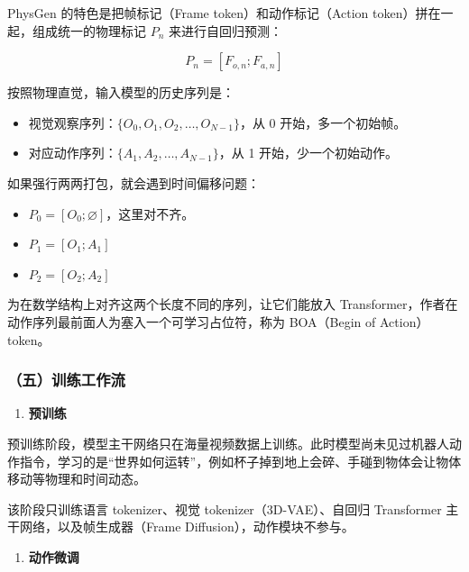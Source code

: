 PhysGen 的特色是把帧标记（Frame token）和动作标记（Action token）拼在一起，组成统一的物理标记 \(P_n\) 来进行自回归预测：

\[
P_n = [F_{o,n}; F_{a,n}]
\]

按照物理直觉，输入模型的历史序列是：

\begin{itemize}
\tightlist
\item
  视觉观察序列：\(\{O_0,O_1,O_2,\ldots,O_{N-1}\}\)，从 0 开始，多一个初始帧。
\item
  对应动作序列：\(\{A_1,A_2,\ldots,A_{N-1}\}\)，从 1 开始，少一个初始动作。
\end{itemize}

如果强行两两打包，就会遇到时间偏移问题：

\begin{itemize}
\tightlist
\item
  \(P_0 = [O_0; \varnothing]\)，这里对不齐。
\item
  \(P_1 = [O_1; A_1]\)
\item
  \(P_2 = [O_2; A_2]\)
\end{itemize}

为在数学结构上对齐这两个长度不同的序列，让它们能放入 Transformer，作者在动作序列最前面人为塞入一个可学习占位符，称为 BOA（Begin of Action）token。

\hypertarget{ux4e94ux8badux7ec3ux5de5ux4f5cux6d41}{%
\subsubsection{（五）训练工作流}\label{ux4e94ux8badux7ec3ux5de5ux4f5cux6d41}}

\begin{enumerate}
\def\labelenumi{\arabic{enumi}.}
\tightlist
\item
  \textbf{预训练}
\end{enumerate}

预训练阶段，模型主干网络只在海量视频数据上训练。此时模型尚未见过机器人动作指令，学习的是``世界如何运转''，例如杯子掉到地上会碎、手碰到物体会让物体移动等物理和时间动态。

该阶段只训练语言 tokenizer、视觉 tokenizer（3D-VAE）、自回归 Transformer 主干网络，以及帧生成器（Frame Diffusion），动作模块不参与。

\begin{enumerate}
\def\labelenumi{\arabic{enumi}.}
\setcounter{enumi}{1}
\tightlist
\item
  \textbf{动作微调}
\end{enumerate}

